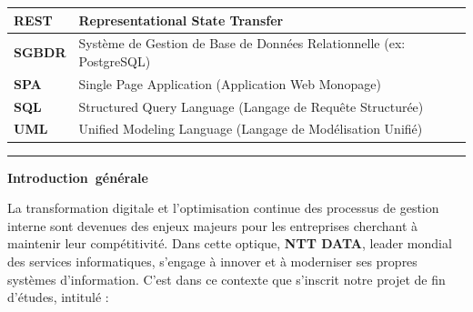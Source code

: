 \documentclass[12pt, a4paper, openany]{report}
\begin{document}
\begin{center}
\begin{tabular}{|>{\centering\arraybackslash}p{}|>{\raggedright\arraybackslash}p{}|}
    \textbf{REST} & Representational State Transfer \\
    \hline
    \textbf{SGBDR} & Système de Gestion de Base de Données Relationnelle (ex: PostgreSQL) \\
    \hline
    \rowcolor{lightBlue}
    \textbf{SPA} & Single Page Application (Application Web Monopage) \\
    \hline
    \textbf{SQL} & Structured Query Language (Langage de Requête Structurée) \\
    \hline
    \rowcolor{lightBlue}
    \textbf{UML} & Unified Modeling Language (Langage de Modélisation Unifié) \\
    \hline
\end{tabular}
\end{center}



\newpage
{} 
\pagestyle{frontmatter} 


{}

\vspace*{0.5cm} 



\noindent
\textcolor{royalBlue}{\rule{0.3\textwidth}{1pt}}
\hfill
\mbox{\fontsize{24}{28}\selectfont\color{royalBlue}\bfseries Introduction générale}

\vspace{1.0cm}


\setlength{\parskip}{0.2cm}
\renewcommand{\baselinestretch}{1.2}\selectfont

La transformation digitale et l'optimisation continue des processus de gestion interne sont devenues des enjeux majeurs pour les entreprises cherchant à maintenir leur compétitivité. Dans cette optique, \textbf{NTT DATA}, leader mondial des services informatiques, s'engage à innover et à moderniser ses propres systèmes d'information. C'est dans ce contexte que s'inscrit notre projet de fin d'études, intitulé : 
\end{document}
